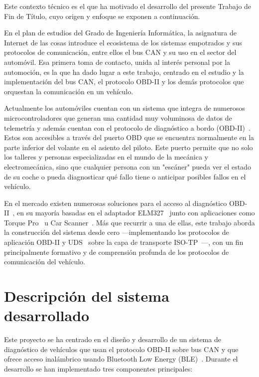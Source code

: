 Este contexto técnico es el que ha motivado el desarrollo del presente Trabajo de Fin de Título, cuyo origen y enfoque se exponen a continuación.

En el plan de estudios del Grado de Ingeniería Informática, la asignatura de Internet de las cosas introduce el ecosistema de los sistemas empotrados y sus protocolos de comunicación, entre ellos el bus CAN y su uso en el sector del automóvil. Esa primera toma de contacto, unida al interés personal por la automoción, es la que ha dado lugar a este trabajo, centrado en el estudio y la implementación del bus CAN, el protocolo OBD-II y los demás protocolos que orquestan la comunicación en un vehículo.

Actualmente los automóviles cuentan con un sistema que integra de numerosos microcontroladores que generan una cantidad muy voluminosa de datos de telemetría y además cuentan con el protocolo de diagnóstico a bordo (OBD-II)~\cite{CARB_OBDII}. Estos son accesibles a través del puerto OBD que se encuentra normalmente en la parte inferior del volante en el asiento del piloto. Este puerto permite que no solo los talleres y personas especializadas en el mundo de la mecánica y electromecánica, sino que cualquier persona con un "escáner" pueda ver el estado de su coche o pueda diagnosticar qué fallo tiene o anticipar posibles fallos en el vehículo.

En el mercado existen numerosas soluciones para el acceso al diagnóstico OBD-II~\cite{CSSElec_OBD2}, en su mayoría basadas en el adaptador ELM327~\cite{ELM327_datasheet} junto con aplicaciones como Torque Pro~\cite{Torque_Pro} u Car Scanner~\cite{CarScanner_app}. Más que recurrir a una de ellas, este trabajo aborda la construcción del sistema desde cero —implementando los protocolos de aplicación OBD-II y UDS~\cite{ISO14229-1:2020} sobre la capa de transporte ISO-TP~\cite{ISO15765-2:2016}—, con un fin principalmente formativo y de comprensión profunda de los protocolos de comunicación del vehículo.

\section{Descripción del sistema desarrollado}

Este proyecto se ha centrado en el diseño y desarrollo de un sistema de diagnóstico de vehículos que usan el protocolo OBD-II sobre bus CAN y que ofrece acceso inalámbrico usando Bluetooth Low Energy (BLE)~\cite{Bluetooth_BLE}. Durante el desarrollo se han implementado tres componentes principales:


